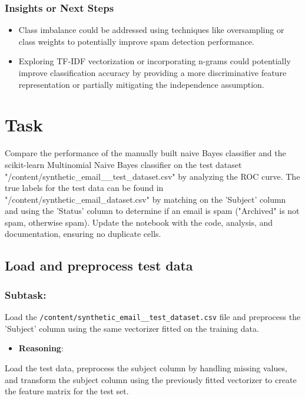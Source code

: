 \documentclass[12pt,a4paper]{article}
\begin{document}
\subsubsection{Insights or Next Steps}

\begin{itemize}
    \item Class imbalance could be addressed using techniques like oversampling or class weights to potentially improve spam detection performance.
    \item Exploring TF-IDF vectorization or incorporating n-grams could potentially improve classification accuracy by providing a more discriminative feature representation or partially mitigating the independence assumption.
\end{itemize}


\section{Task}
Compare the performance of the manually built naive Bayes classifier and the scikit-learn Multinomial Naive Bayes classifier on the test dataset "/content/synthetic\_email\_\_test\_dataset.csv" by analyzing the ROC curve. The true labels for the test data can be found in "/content/synthetic\_email\_dataset.csv" by matching on the 'Subject' column and using the 'Status' column to determine if an email is spam ("Archived" is not spam, otherwise spam). Update the notebook with the code, analysis, and documentation, ensuring no duplicate cells.

\subsection{Load and preprocess test data}

\subsubsection{Subtask:}
Load the \texttt{/content/synthetic\_email\_\_test\_dataset.csv} file and preprocess the 'Subject' column using the same vectorizer fitted on the training data.


\begin{itemize}
    \item \textbf{Reasoning}:
\end{itemize}

Load the test data, preprocess the subject column by handling missing values, and transform the subject column using the previously fitted vectorizer to create the feature matrix for the test set.
\end{document}
